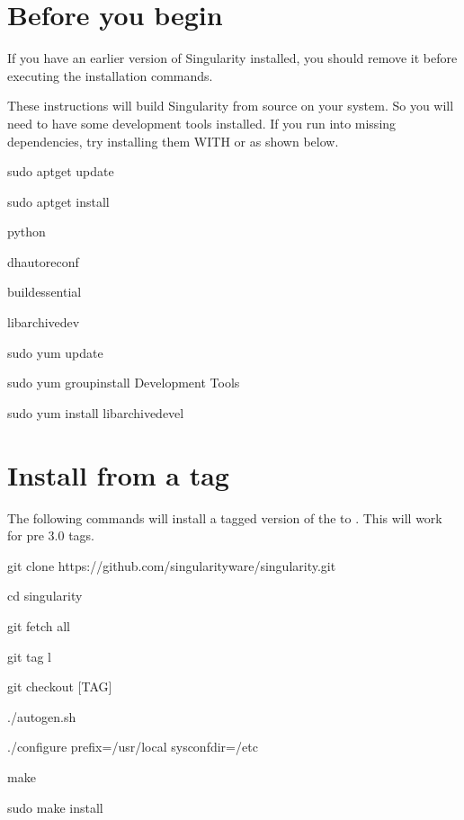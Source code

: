 \documentclass[letterpaper,10pt,english]{sphinxmanual}
\begin{document}
\section{Before you begin}
\label{\detokenize{installation:before-you-begin}}
If you have an earlier version of Singularity installed, you should
remove it before executing the installation commands.

These instructions will build Singularity from source on your system.
So you will need to have some development tools installed. If you run
into missing dependencies, try installing them WITH  or  as shown below.

%
\begin{sphinxVerbatim}[commandchars=\\\{\}]
\PYGZdl{} sudo apt\PYGZhy{}get update \PYGZam{}\PYGZam{} \PYGZbs{}

    sudo apt\PYGZhy{}get install \PYGZbs{}

    python \PYGZbs{}

    dh\PYGZhy{}autoreconf \PYGZbs{}

    build\PYGZhy{}essential \PYGZbs{}

    libarchive\PYGZhy{}dev
\end{sphinxVerbatim}

%
\begin{sphinxVerbatim}[commandchars=\\\{\}]
\PYGZdl{} sudo yum update \PYGZam{}\PYGZam{} \PYGZbs{}

    sudo yum groupinstall \PYGZsq{}Development Tools\PYGZsq{} \PYGZam{}\PYGZam{} \PYGZbs{}

    sudo yum install libarchive\PYGZhy{}devel
\end{sphinxVerbatim}


\section{Install from a tag}
\label{\detokenize{installation:install-from-a-tag}}
The following commands will install a tagged version of the  to .
This will work for pre 3.0 tags.

%
\begin{sphinxVerbatim}[commandchars=\\\{\}]
\PYGZdl{} git clone https://github.com/singularityware/singularity.git

\PYGZdl{} cd singularity

\PYGZdl{} git fetch \PYGZhy{}\PYGZhy{}all

\PYGZdl{} git tag \PYGZhy{}l

\PYGZdl{} git checkout [TAG]

\PYGZdl{} ./autogen.sh

\PYGZdl{} ./configure \PYGZhy{}\PYGZhy{}prefix=/usr/local \PYGZhy{}\PYGZhy{}sysconfdir=/etc

\PYGZdl{} make

\PYGZdl{} sudo make install
\end{sphinxVerbatim}
\end{document}
